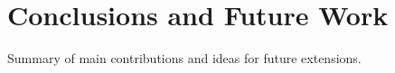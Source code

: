 \chapter{Conclusions and Future Work}

Summary of main contributions and ideas for future extensions.
